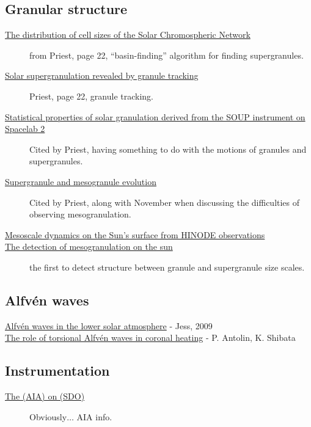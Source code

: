 \documentclass{article}
\begin{document}
\subsection{Granular structure}
\begin{description}
    \item [\href{http://cdsads.u-strasbg.fr/abs/1997ApJ...481..988H}
        {The distribution of cell sizes of the Solar Chromospheric Network}]
        from Priest, page 22, ``basin-finding'' algorithm for finding
        supergranules.
    \item [\href{http://cdsads.u-strasbg.fr/abs/2008A\%26A...479L..17R}
        {Solar supergranulation revealed by granule tracking}]
        Priest, page 22, granule tracking.
    \item [\href{http://cdsads.u-strasbg.fr/abs/1989ApJ...336..475T}
        {Statistical properties of solar granulation derived
        from the SOUP instrument on Spacelab 2}]
        Cited by Priest, having something to do with the motions of granules and supergranules.
    \item [\href{http://cdsads.u-strasbg.fr/abs/2000SoPh..193..313S}
        {Supergranule and mesogranule evolution}]
        Cited by Priest, along with November when
        discussing the difficulties of observing mesogranulation.
    \item [\href{http://adsabs.harvard.edu/cgi-bin/bib_query?arXiv:0902.2299}
        {Mesoscale dynamics on the Sun's surface from HINODE
        observations}]
    \item [\href{http://adsabs.harvard.edu/abs/1981ApJ...245L.123N}
        {The detection of mesogranulation on the sun}]
        the first to detect structure between granule
        and supergranule size scales.
\end{description}

\subsection{Alfv\'en waves}
\begin{description}
    \item [\href{http://arxiv.org/abs/0903.3546}
        {Alfv\'en waves in the lower solar atmosphere}
        - Jess, 2009]
    \item [\href{https://arxiv.org/abs/0910.0962}
        {The role of torsional Alfv\'en waves in coronal heating}
        - P. Antolin, K. Shibata]
\end{description}

\subsection{Instrumentation}
\begin{description}
    \item [\href{http://cdsads.u-strasbg.fr/abs/2012SoPh..275...17L}
            {The (AIA) on (SDO)}]
            Obviously$\ldots$ AIA info.
\end{description}
\end{document}
